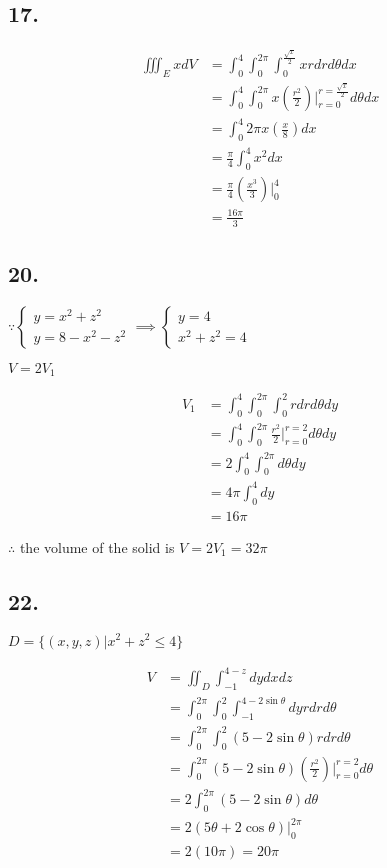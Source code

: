 \documentclass{article}
\begin{document}
  \subsection*{17. }

  $$\begin{aligned}
    \iiint_E x dV &= \int_0^4 \int_0^{2\pi} \int_0^{\frac{\sqrt x}{2}} x r dr d\theta dx \\
    &= \int_0^4 \int_0^{2\pi} x(\frac{r^2}{2})\biggl|_{r=0}^{r=\frac{\sqrt x}{2}} d\theta dx \\
    &= \int_0^4 2\pi x (\frac x 8) dx \\
    &= \frac{\pi}{4} \int_0^4 x^2 dx \\
    &= \frac \pi 4 (\frac{x^3}{3})\biggl|_0^4 \\
    &= \frac{16\pi}{3}
  \end{aligned}$$

  \subsection*{20. }

  $\because \left\{ \begin{array}{ll} y=x^2+z^2 \\ y = 8 - x^2 - z^2 \end{array}\right. \implies \left\{ \begin{array}{ll} y = 4 \\ x^2 + z^2 = 4 \end{array}\right.$

  $V = 2V_1$

  $$\begin{aligned}
    V_1 &= \int_0^4 \int_0^{2\pi} \int_0^2 r dr d\theta dy \\
    &= \int_0^4 \int_0^{2\pi} \frac{r^2}{2}\biggl|_{r=0}^{r=2} d\theta dy \\
    &= 2\int_0^4 \int_0^{2\pi} d\theta dy \\
    &= 4\pi \int_0^4 dy \\
    &= 16\pi
  \end{aligned}$$

  $\therefore$ the volume of the solid is $V = 2V_1 = 32\pi$

  \subsection*{22. }

  $D = \{ (x, y, z) | x^2 + z^2 \leq 4 \}$

  $$\begin{aligned}
    V &= \iint_D \int_{-1}^{4-z} dy dx dz  \\
    &= \int_0^{2\pi} \int_0^2 \int_{-1}^{4-2\sin \theta} dy r dr d\theta \\
    &= \int_0^{2\pi} \int_0^2 (5-2\sin \theta) r dr d\theta \\
    &= \int_0^{2\pi} (5-2\sin \theta) (\frac{r^2}{2})\biggl|_{r=0}^{r=2} d\theta \\
    &= 2\int_0^{2\pi} (5-2\sin \theta) d\theta \\
    &= 2(5\theta + 2\cos \theta)\biggl|_0^{2\pi} \\
    &= 2(10\pi) = 20\pi
  \end{aligned}$$
\end{document}
